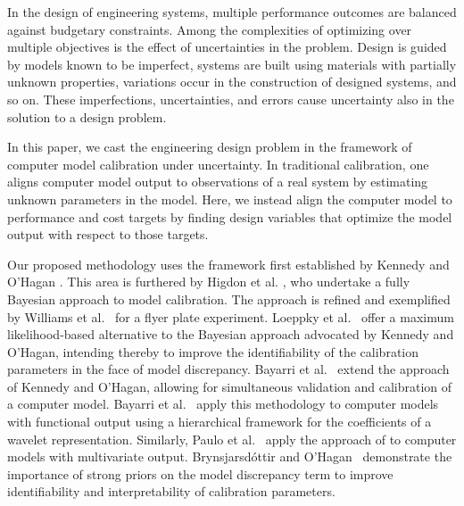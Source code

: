 \documentclass[twocolumn,10pt]{asme2ej}
\begin{document}
In the design of engineering systems, multiple performance outcomes are balanced against budgetary constraints. 
%
Among the complexities of optimizing over multiple objectives is the effect of uncertainties in the problem. 
%
Design is guided by models known to be imperfect, systems are built using materials with partially unknown properties, variations occur in the construction of designed systems, and so on. 
%
These imperfections, uncertainties, and errors cause uncertainty also in the solution to a design problem. 
%

%
In this paper, we cast the engineering design problem in the framework of computer model calibration under uncertainty.
%
In traditional calibration, one aligns computer model output to observations of a real system by estimating unknown parameters in the model.
%
Here, we instead align the computer model to performance and cost targets by finding design variables that optimize the model output with respect to those targets.
%

%
Our proposed methodology uses the framework first established by Kennedy and O'Hagan \cite{Kennedy2001}.
% 
This area is furthered by Higdon et al. \cite{Higdon2004}, who undertake a fully Bayesian approach to model calibration. 
%
%
The approach is refined and exemplified by Williams et al.\ \cite{Williams2006} for a flyer plate experiment.
%
Loeppky et al.\ \cite{Loeppky2006} offer a maximum likelihood-based alternative to the Bayesian approach advocated by Kennedy and O'Hagan, intending thereby to improve the identifiability of the calibration parameters in the face of model discrepancy. 
%
Bayarri et al.\ \cite{Bayarri2007} extend the approach of Kennedy and O'Hagan, allowing for simultaneous validation and calibration of a computer model. %
%
Bayarri et al.\ \cite{Bayarri} apply this methodology to computer models with functional output using a hierarchical framework for the coefficients of a wavelet representation. 
%
Similarly, Paulo et al.\ \cite{Paulo2012} apply the approach of \cite{Bayarri2007} to computer models with multivariate output.
%
Brynsjarsd\'ottir and O'Hagan\ \cite{Brynjarsdottir2014} demonstrate the importance of strong priors on the model discrepancy term to improve identifiability and interpretability of calibration parameters.
%
\end{document}
